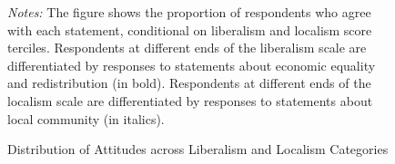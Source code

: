 \documentclass[article,11pt]{memoir}
\begin{document}
\begin{figure}[p]\centering
  \caption{Distribution of Attitudes across Liberalism and Localism Categories}
  \label{fig:e_pc}
  \begin{measuredfigure}
  \end{measuredfigure}
  \begin{tablenotes}[flushleft]
    \item \hspace{-.2em}\emph{Notes:} The figure shows the proportion of respondents who agree with each statement, conditional on liberalism and localism score terciles.  Respondents at different ends of the liberalism scale are differentiated by responses to statements about economic equality and redistribution (in bold). Respondents at different ends of the localism scale are differentiated by responses to statements about local community (in italics). 
  \end{tablenotes}
\end{figure}
\end{document}

